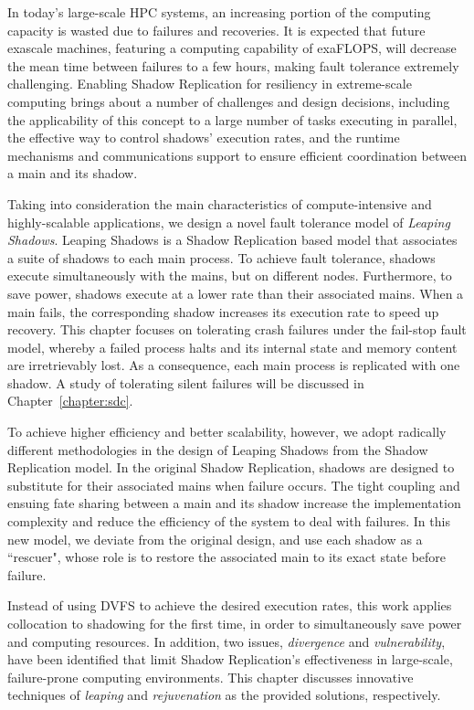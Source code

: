 In today's large-scale HPC systems, an increasing portion of the computing capacity is wasted due to failures and recoveries. It is expected
that future exascale machines,  featuring a computing capability of exaFLOPS, will decrease the mean time between
failures to a few hours, making fault tolerance extremely challenging. 
Enabling Shadow Replication for resiliency in extreme-scale computing 
brings about a number of challenges and design decisions, including the applicability of this concept to a large number of 
tasks executing in parallel, the effective way to control shadows' execution rates, and the runtime mechanisms and 
communications support to ensure efficient coordination between a 
main and its shadow.


Taking into consideration the main characteristics of compute-intensive and highly-scalable applications, we design a novel fault tolerance model of \textit{Leaping Shadows}. Leaping Shadows is a Shadow Replication based model that associates a suite of shadows
to each main process. To achieve fault tolerance, shadows
execute simultaneously with the mains, but on different
nodes. Furthermore, to save power, shadows execute at a
lower rate than their associated mains. When a main fails,
the corresponding shadow increases its execution rate to speed up recovery.
This chapter focuses on tolerating crash failures under the fail-stop fault model, 
whereby a failed process halts and its internal state and
memory content are irretrievably lost. As a consequence, each main process is replicated with one shadow.  A study of tolerating silent failures will be discussed in Chapter~\ref{chapter:sdc}. 

To achieve higher efficiency and better scalability, however, we adopt radically different methodologies in the design of Leaping Shadows from the Shadow Replication model.
In the original Shadow Replication, shadows are designed to
substitute for their associated mains when failure occurs. The tight coupling and ensuing fate sharing between a main and its shadow increase the implementation complexity and reduce the efficiency of
the system to deal with failures.
In this new model, we deviate from the original design, and use each shadow as a ``rescuer", whose role is to restore the associated main
to its exact state before failure.

Instead of using DVFS to achieve the desired execution rates, this work applies collocation to shadowing for the first time, in order to simultaneously save power and computing resources. In addition, two issues, \textit{divergence} and \textit{vulnerability}, have been identified that limit Shadow Replication's effectiveness in large-scale, failure-prone computing environments. This chapter discusses innovative techniques of {\it leaping} and {\it  rejuvenation} as the provided solutions, respectively. %

